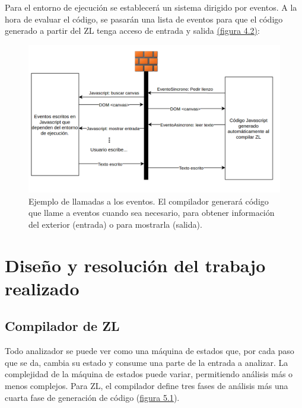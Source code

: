 \documentclass{report}
\begin{document}
	Para el entorno de ejecución se establecerá un sistema dirigido por eventos. A la hora de evaluar el código, se pasarán una lista de eventos para que el código generado a partir del ZL tenga acceso de entrada y salida \hyperref[fig:diagramaeventos]{(figura 4.2)}:

\begin{figure}
\centering
\includegraphics[width=1\linewidth]{diagramaeventos}
\caption[Diagrama de ejemplo de intercambios usando eventos.]{Ejemplo de llamadas a los eventos. El compilador generará código que llame a eventos cuando sea necesario, para obtener información del exterior (entrada) o para mostrarla (salida).}
\label{fig:diagramaeventos}
\end{figure}

	\chapter{Diseño y resolución del trabajo realizado}
	
	\section{Compilador de ZL}
	
	Todo analizador se puede ver como una máquina de estados que, por cada paso que se da, cambia su estado y consume una parte de la entrada a analizar. La complejidad de la máquina de estados puede variar, permitiendo análisis más o menos complejos. Para ZL, el compilador define tres fases de análisis más una cuarta fase de generación de código (\hyperref[fig:fasesanalisis]{figura 5.1}).
		
\end{document}
